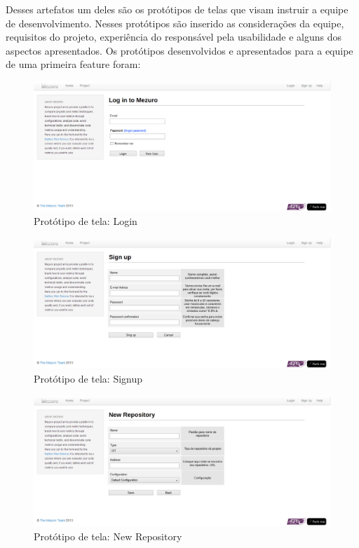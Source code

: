 Desses artefatos um deles são os protótipos de telas que visam instruir a equipe de desenvolvimento. Nesses protótipos são inserido as considerações da equipe, requisitos do projeto, experiência do responsável pela usabilidade e alguns dos aspectos apresentados. Os protótipos desenvolvidos e apresentados para a equipe de uma primeira feature foram:
 
\begin{figure}[H]
  \begin{center}
    \includegraphics[width=1\textwidth]{figuras/Login.eps}
    \caption{Protótipo de tela: Login}
    \label{fig:pLogin}
  \end{center}
\end{figure}

\begin{figure}[H]
  \begin{center}
    \includegraphics[width=1\textwidth]{figuras/Signup.eps}
    \caption{Protótipo de tela: Signup}
    \label{fig:pSignup}
  \end{center}
\end{figure}

\begin{figure}[H]
  \begin{center}
    \includegraphics[width=1\textwidth]{figuras/NewRepository.eps}
    \caption{Protótipo de tela: New Repository}
    \label{fig:pNewRepository}
  \end{center}
\end{figure}

